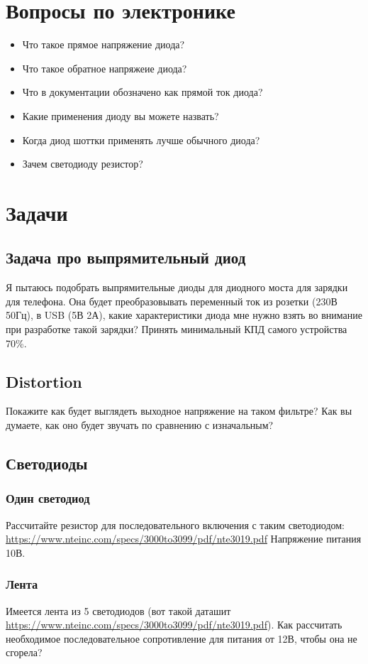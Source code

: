 \documentclass[a4paper,12pt]{article} %
\begin{document}
\section{Вопросы по электронике}

\begin{itemize}
  \item Что такое прямое напряжение диода?
  \item Что такое обратное напряжеие диода?
  \item Что в документации обозначено как прямой ток диода?
  \item Какие применения диоду вы можете назвать?
  \item Когда диод шоттки применять лучше обычного диода?
  \item Зачем светодиоду резистор?
\end{itemize}

\section{Задачи}
  \subsection{Задача про выпрямительный диод}
Я пытаюсь подобрать выпрямительные диоды для диодного моста для зарядки для телефона. Она будет преобразовывать переменный ток из розетки (230В 50Гц), в USB (5В 2А), какие характеристики диода мне нужно взять во внимание при разработке такой зарядки? Принять минимальный КПД самого устройства 70\%.

  \subsection{Distortion}
  Покажите как будет выглядеть выходное напряжение на таком фильтре? Как вы думаете, как оно будет звучать по сравнению с изначальным?

  \subsection{Светодиоды}

  \subsubsection{Один светодиод}
  Рассчитайте резистор для последовательного включения с таким светодиодом: \url{https://www.nteinc.com/specs/3000to3099/pdf/nte3019.pdf} Напряжение питания 10В.
  \subsubsection{Лента}
  Имеется лента из 5 светодиодов (вот такой даташит \url{https://www.nteinc.com/specs/3000to3099/pdf/nte3019.pdf}). Как рассчитать необходимое последовательное сопротивление для питания от 12В, чтобы она не сгорела?
\end{document}
